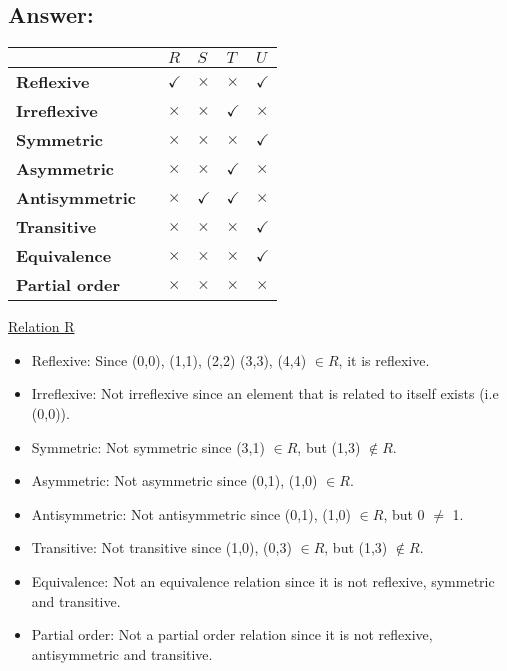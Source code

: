\subsection{Answer:}
\begin{center}
\begin{tabular}{|l|l|l|l|l|l|}
\hline
						&	&	$R$	&	$S$	&	$T$	& $U$\\
\hline
\textbf{Reflexive} 	    &   &$\checkmark$		&$\times$		&$\times$	&$\checkmark$	 \\
\hline
\textbf{Irreflexive} 	&   &$\times$		&$\times$		&$\checkmark$	&$\times$	 \\
\hline
\textbf{Symmetric} 	    &   &$\times$		&$\times$		&$\times$	&$\checkmark$	 \\
\hline
\textbf{Asymmetric} 	&   &$\times$		&$\times$		&$\checkmark$	&$\times$	 \\
\hline
\textbf{Antisymmetric}  &   &$\times$		&$\checkmark$		&$\checkmark$	&$\times$	 \\
\hline
\textbf{Transitive} 	&   &$\times$		&$\times$		&$\times$	&$\checkmark$	 \\
\hline
\textbf{Equivalence} 	&   &$\times$		&$\times$		&$\times$	&$\checkmark$	 \\
\hline
\textbf{Partial order} 	&   &$\times$		&$\times$		&$\times$	&$\times$	 \\
\hline
\end{tabular}
\end{center}

\underline{Relation R}
\begin{itemize}
    \item Reflexive:  Since (0,0), (1,1), (2,2) (3,3), (4,4) $\in R$, it is reflexive.
    \item Irreflexive: Not irreflexive since an element that is related to itself exists (i.e (0,0)).
    \item Symmetric: Not symmetric since (3,1) $\in R$, but (1,3) $\notin R$.
    \item Asymmetric: Not asymmetric since (0,1), (1,0) $\in R$.
    \item Antisymmetric: Not antisymmetric since (0,1), (1,0) $\in R$, but 0 $\neq$ 1.
    \item Transitive: Not transitive since (1,0), (0,3) $\in R$, but (1,3) $\notin R$. 
    \item Equivalence: Not an equivalence relation since it is not reflexive, symmetric and transitive.
    \item Partial order: Not a partial order relation since it is not reflexive, antisymmetric and transitive.
\end{itemize}


